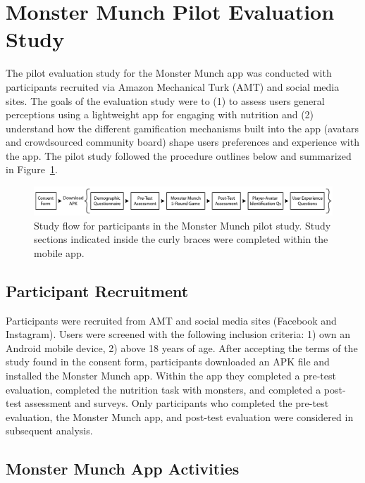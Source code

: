 \vspace{-5pt}
\section{Monster Munch Pilot Evaluation Study}

The pilot evaluation study for the Monster Munch app was conducted with participants recruited via 
Amazon Mechanical Turk (AMT) and social media sites. The goals of the evaluation study were to (1) to assess users general perceptions using a lightweight app for engaging with nutrition and (2) understand how the different gamification mechanisms built into the app (avatars and crowdsourced community board) shape users preferences and experience with the app. The pilot study followed the procedure outlines below and summarized in Figure~\ref{fig:studyflow}. 


\begin{figure}[h]
\includegraphics[width=\textwidth]{samples/images/figure-1.png}
\caption{Study flow for participants in the Monster Munch pilot study. Study sections indicated inside the curly braces were completed within the mobile app. }
\label{fig:studyflow}
\end{figure}

\vspace{-5pt}
\subsection{Participant Recruitment}
Participants were recruited from AMT and social media sites (Facebook and Instagram). Users were screened with the following inclusion criteria: 1) own an Android mobile device, 2) above 18 years of age. After accepting the terms of the study found in the consent form, participants  downloaded an APK file and installed the Monster Munch app. Within the app they completed a pre-test evaluation, completed the nutrition task with monsters, and completed a post-test assessment and surveys. Only participants who completed the pre-test evaluation, the Monster Munch app, and post-test evaluation were considered in subsequent analysis. 


\vspace{-5pt}
\subsection{Monster Munch App Activities}


